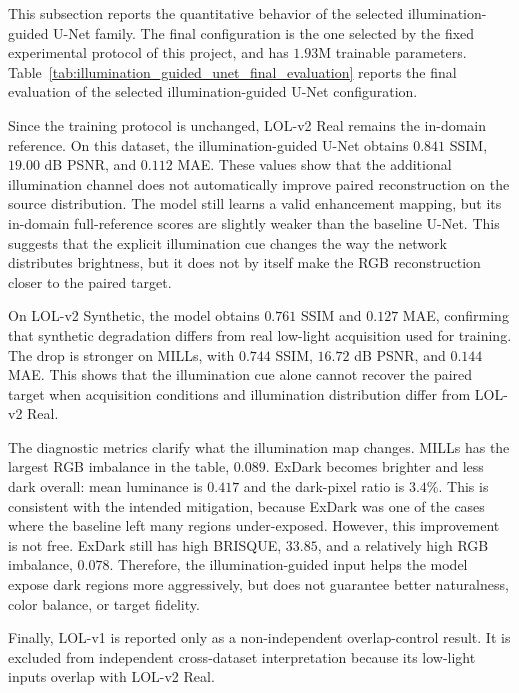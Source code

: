 This subsection reports the quantitative behavior of the selected illumination-guided U-Net family. The final configuration is the one selected by the fixed experimental protocol of this project, and has $1.93$M trainable parameters. Table~\ref{tab:illumination_guided_unet_final_evaluation} reports the final evaluation of the selected illumination-guided U-Net configuration.



Since the training protocol is unchanged, LOL-v2 Real remains the in-domain reference. On this dataset, the illumination-guided U-Net obtains $0.841$ SSIM, $19.00$ dB PSNR, and $0.112$ MAE. These values show that the additional illumination channel does not automatically improve paired reconstruction on the source distribution. The model still learns a valid enhancement mapping, but its in-domain full-reference scores are slightly weaker than the baseline U-Net. This suggests that the explicit illumination cue changes the way the network distributes brightness, but it does not by itself make the RGB reconstruction closer to the paired target.

On LOL-v2 Synthetic, the model obtains $0.761$ SSIM and $0.127$ MAE, confirming that synthetic degradation differs from real low-light acquisition used for training. The drop is stronger on MILLs, with $0.744$ SSIM, $16.72$ dB PSNR, and $0.144$ MAE. This shows that the illumination cue alone cannot recover the paired target when acquisition conditions and illumination distribution differ from LOL-v2 Real.

The diagnostic metrics clarify what the illumination map changes. MILLs has the largest RGB imbalance in the table, $0.089$. ExDark becomes brighter and less dark overall: mean luminance is $0.417$ and the dark-pixel ratio is $3.4\%$. This is consistent with the intended mitigation, because ExDark was one of the cases where the baseline left many regions under-exposed. However, this improvement is not free. ExDark still has high BRISQUE, $33.85$, and a relatively high RGB imbalance, $0.078$. Therefore, the illumination-guided input helps the model expose dark regions more aggressively, but does not guarantee better naturalness, color balance, or target fidelity.

Finally, LOL-v1 is reported only as a non-independent overlap-control result. It is excluded from independent cross-dataset interpretation because its low-light inputs overlap with LOL-v2 Real.

